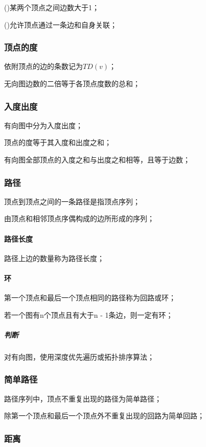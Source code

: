 ()某两个顶点之间边数大于1；

()允许顶点通过一条边和自身关联；



\subsubsection{顶点的度}
依附顶点的边的条数记为\(TD(v)\)；

无向图边数的二倍等于各顶点度数的总和；


\subsubsection{入度出度}
有向图中分为入度出度；

顶点的度等于其入度和出度之和；

有向图全部顶点的入度之和与出度之和相等，且等于边数；


\subsubsection{路径}
顶点到顶点之间的一条路径是指顶点序列；

由顶点和相邻顶点序偶构成的边所形成的序列；

\paragraph{路径长度}
路径上边的数量称为路径长度；

\paragraph{环}
第一个顶点和最后一个顶点相同的路径称为回路或环；

若一个图有n个顶点且有大于n - 1条边，则一定有环；

\subparagraph{判断}
对有向图，使用深度优先遍历或拓扑排序算法；


\subsubsection{简单路径}

路径序列中，顶点不重复出现的路径为简单路径；

除第一个顶点和最后一个顶点外不重复出现的回路为简单回路；


\subsubsection{距离}

